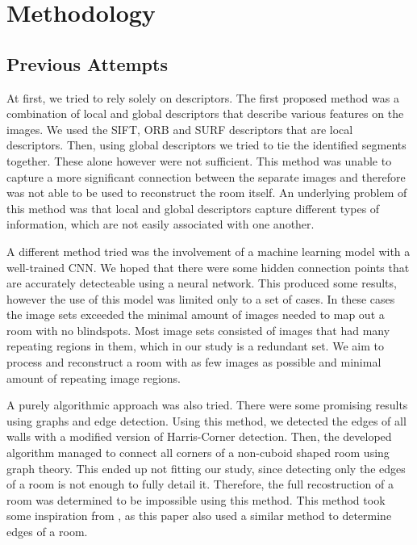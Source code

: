 \section{Methodology}
\label{sec:methodology}

\subsection{Previous Attempts} %
At first, we tried to rely solely on descriptors. The first proposed method was a combination of local and global descriptors that describe various features on the images. We used the SIFT, ORB and SURF descriptors that are local descriptors. Then, using global descriptors we tried to tie the identified segments together. These alone however were not sufficient. This method was unable to capture a more significant connection between the separate images and therefore was not able to be used to reconstruct the room itself. An underlying problem of this method was that local and global descriptors capture different types of information, which are not easily associated with one another.

A different method tried was the involvement of a machine learning model with a well-trained CNN. We hoped that there were some hidden connection points that are accurately detecteable using a neural network. This produced some results, however the use of this model was limited only to a set of cases. In these cases the image sets exceeded the minimal amount of images needed to map out a room with no blindspots. Most image sets consisted of images that had many repeating regions in them, which in our study is a redundant set. We aim to process and reconstruct a room with as few images as possible and minimal amount of repeating image regions.   

A purely algorithmic approach was also tried. There were some promising results using graphs and edge detection. Using this method, we detected the edges of all walls with a modified version of Harris-Corner detection. Then, the developed algorithm managed to connect all corners of a non-cuboid shaped room using graph theory. This ended up not fitting our study, since detecting only the edges of a room is not enough to fully detail it. Therefore, the full recostruction of a room was determined to be impossible using this method. This method took some inspiration from \cite{9707088}, as this paper also used a similar method to determine edges of a room.


